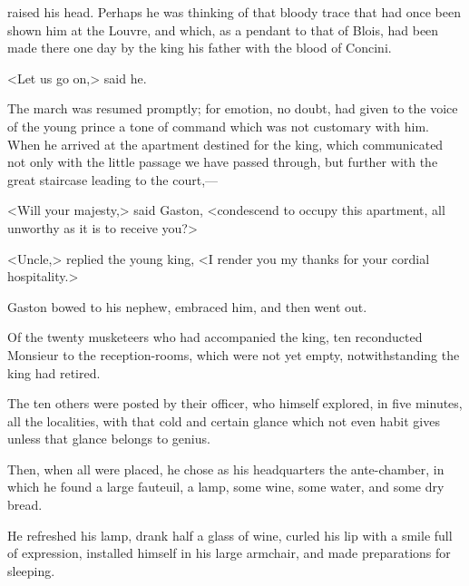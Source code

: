  raised his head. Perhaps he was thinking of that bloody trace that had once been shown him at the Louvre, and which, as a pendant to that of Blois, had been made there one day by the king his father with the blood of Concini.

<Let us go on,> said he.

The march was resumed promptly; for emotion, no doubt, had given to the voice of the young prince a tone of command which was not customary with him. When he arrived at the apartment destined for the king, which communicated not only with the little passage we have passed through, but further with the great staircase leading to the court,—

<Will your majesty,> said Gaston, <condescend to occupy this apartment, all unworthy as it is to receive you?>

<Uncle,> replied the young king, <I render you my thanks for your cordial hospitality.>

Gaston bowed to his nephew, embraced him, and then went out.

Of the twenty musketeers who had accompanied the king, ten reconducted Monsieur to the reception-rooms, which were not yet empty, notwithstanding the king had retired.

The ten others were posted by their officer, who himself explored, in five minutes, all the localities, with that cold and certain glance which not even habit gives unless that glance belongs to genius.

Then, when all were placed, he chose as his headquarters the ante-chamber, in which he found a large fauteuil, a lamp, some wine, some water, and some dry bread.

He refreshed his lamp, drank half a glass of wine, curled his lip with a smile full of expression, installed himself in his large armchair, and made preparations for sleeping. 